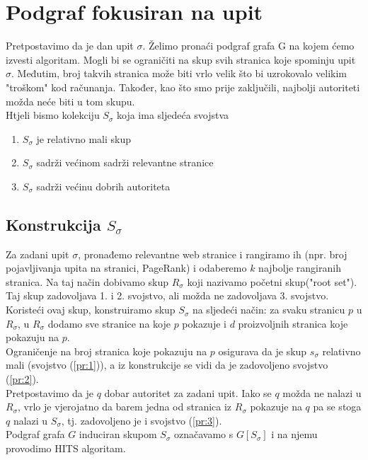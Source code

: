 \documentclass[11pt]{article}
\begin{document}
\section{Podgraf fokusiran na upit}
Pretpostavimo da je dan upit $\sigma$. Želimo pronaći podgraf grafa G na kojem ćemo izvesti algoritam. Mogli bi se ograničiti na skup svih stranica koje spominju upit $\sigma$. Međutim, broj takvih stranica može biti vrlo velik što bi uzrokovalo velikim "troškom" kod računanja. Također, kao što smo prije zaključili, najbolji autoriteti možda neće biti u tom skupu.\\
Htjeli bismo kolekciju $S_{\sigma}$ koja ima sljedeća svojstva
\begin{enumerate}
\item $S_{\sigma}$ je relativno mali skup \label{pr:1}
\item $S_{\sigma}$ sadrži većinom sadrži relevantne stranice \label{pr:2}
\item $S_{\sigma}$ sadrži većinu dobrih autoriteta \label{pr:3}
\end{enumerate}
\subsection{Konstrukcija $S_{\sigma}$}
Za zadani upit $\sigma$, pronađemo relevantne web stranice i rangiramo ih (npr. broj pojavljivanja upita na stranici, PageRank) i odaberemo $k$ najbolje rangiranih stranica. Na taj način dobivamo skup $R_{\sigma}$ koji nazivamo početni skup("root set"). Taj skup zadovoljava 1. i 2. svojstvo, ali možda ne zadovoljava 3. svojstvo. Koristeći ovaj skup, konstruiramo skup $S_{\sigma}$ na sljedeći način: za svaku stranicu $p$ u $R_{\sigma}$, u $R_{\sigma}$ dodamo sve stranice na koje $p$ pokazuje i $d$ proizvoljnih stranica koje pokazuju na $p$.\\
Ograničenje na broj stranica koje pokazuju na $p$ osigurava da je skup $s_{\sigma}$ relativno mali (svojstvo (\ref{pr:1})), a iz konstrukcije se vidi da je zadovoljeno svojstvo (\ref{pr:2}). \\
Pretpostavimo da je $q$ dobar autoritet za zadani upit. Iako se $q$ možda  ne nalazi u $R_{\sigma}$, vrlo je vjerojatno da barem jedna od stranica iz $R_{\sigma}$ pokazuje na $q$ pa se stoga $q$ nalazi u $S_{\sigma}$, tj. zadovoljeno je i svojstvo (\ref{pr:3}).\\
Podgraf grafa $G$ induciran skupom $S_{\sigma}$ označavamo s $G[S_{\sigma}]$ i na njemu provodimo HITS algoritam.
\end{document}
